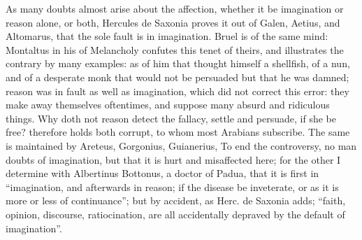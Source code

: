 As many doubts almost arise about the affection, whether
it be imagination or reason alone, or both, Hercules de Saxonia proves it out
of Galen, Aetius, and Altomarus, that the sole fault is in
imagination. Bruel is of the same mind: Montaltus in his
 of Melancholy confutes this tenet of theirs, and
illustrates the contrary by many examples: as of him that thought himself a
shellfish, of a nun, and of a desperate monk that would not be persuaded but
that he was damned; reason was in fault as well as imagination, which did not
correct this error: they make away themselves oftentimes, and suppose many
absurd and ridiculous things. Why doth not reason detect the fallacy, settle
and persuade, if she be free? \Avicenna{} therefore holds
both corrupt, to whom most Arabians subscribe. The same is maintained by
Areteus, Gorgonius, Guianerius,
\etc{} To end the controversy, no man doubts of imagination, but that it is
hurt and misaffected here; for the other I determine with
Albertinus Bottonus, a doctor of Padua, that it is first
in \enquote{imagination, and afterwards in reason; if the disease be inveterate, or as
it is more or less of continuance}; but by accident, as
Herc. de Saxonia adds; \enquote{faith, opinion, discourse,
ratiocination, are all accidentally depraved by the default of imagination}.

